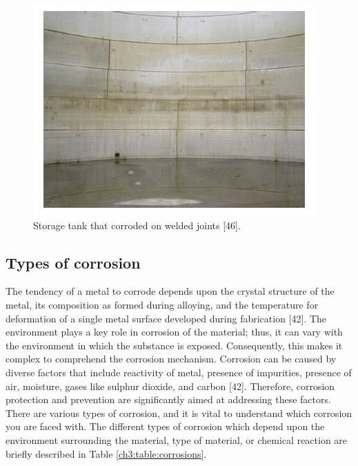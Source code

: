 \documentclass[12pt]{report}
\begin{document}
\begin{figure}[H]
    \centering
    \includegraphics[width=.55\textwidth]{storage_tank.jpg}
    \caption{Storage tank that corroded on welded joints [46].}
    \label{ch3:figure:tank}
\end{figure}

\subsection{Types of corrosion} 
The tendency of a metal to corrode depends upon the crystal structure of the metal, its composition as formed during alloying, and the temperature for deformation of a single metal surface developed during fabrication [42]. The environment plays a key role in corrosion of the material; thus, it can vary with the environment in which the substance is exposed. Consequently, this makes it complex to comprehend the corrosion mechanism. Corrosion can be caused by diverse factors that include reactivity of metal, presence of impurities, presence of air, moisture, gases like sulphur dioxide, and carbon [42]. Therefore, corrosion protection and prevention are significantly aimed at addressing these factors. There are various types of corrosion, and it is vital to understand which corrosion you are faced with. The different types of corrosion which depend upon the environment surrounding the material, type of material, or chemical reaction are briefly described in Table \ref{ch3:table:corrosions}.
\end{document}
